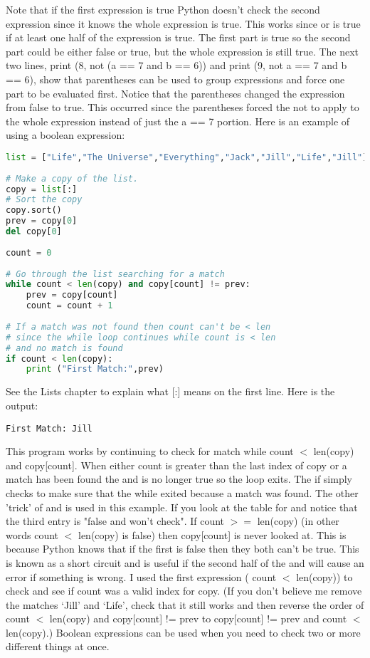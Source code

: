 Note that if the first expression is true Python doesn't check the second
expression since it knows the whole expression is true. This works since or is
true if at least one half of the expression is true. The first part is true so
the second part could be either false or true, but the whole expression is still
true.  The next two lines, print (8, not (a == 7 and b == 6)) and print (9, not
a == 7 and b == 6), show that parentheses can be used to group expressions and
force one part to be evaluated first. Notice that the parentheses changed the
expression from false to true. This occurred since the parentheses forced the
not to apply to the whole expression instead of just the a == 7 portion.
Here is an example of using a boolean expression:
\lstset{basicstyle=\scriptsize, numbers=left, captionpos=b, tabsize=4}
\begin{lstlisting}[caption=Controlflow 3,language={Python},
xleftmargin=15pt, label=lst:controlflow3]
list = ["Life","The Universe","Everything","Jack","Jill","Life","Jill"]
 
# Make a copy of the list.
copy = list[:]
# Sort the copy
copy.sort()
prev = copy[0]
del copy[0]
 
count = 0
 
# Go through the list searching for a match
while count < len(copy) and copy[count] != prev:
    prev = copy[count]
    count = count + 1
 
# If a match was not found then count can't be < len
# since the while loop continues while count is < len
# and no match is found
if count < len(copy):
    print ("First Match:",prev)
\end{lstlisting}
See the Lists chapter to explain what [:] means on the first line.
Here is the output:
\scriptsize
\begin{verbatim}
First Match: Jill
\end{verbatim}
\normalsize
This program works by continuing to check for match while count $<$ len(copy) and
copy[count]. When either count is greater than the last index of copy or a match
has been found the and is no longer true so the loop exits. The if simply checks
to make sure that the while exited because a match was found.  The other 'trick'
of and is used in this example. If you look at the table for and notice that the
third entry is "false and won't check". If count $>=$ len(copy) (in other words
count $<$ len(copy) is false) then copy[count] is never looked at. This is because
Python knows that if the first is false then they both can't be true. This is
known as a short circuit and is useful if the second half of the and will cause
an error if something is wrong. I used the first expression ( count $<$ len(copy))
to check and see if count was a valid index for copy. (If you don't believe me
remove the matches `Jill' and `Life', check that it still works and then reverse
the order of count $<$ len(copy) and copy[count] != prev to copy[count] != prev
and count $<$ len(copy).) Boolean expressions can be used when you need to check
two or more different things at once.


